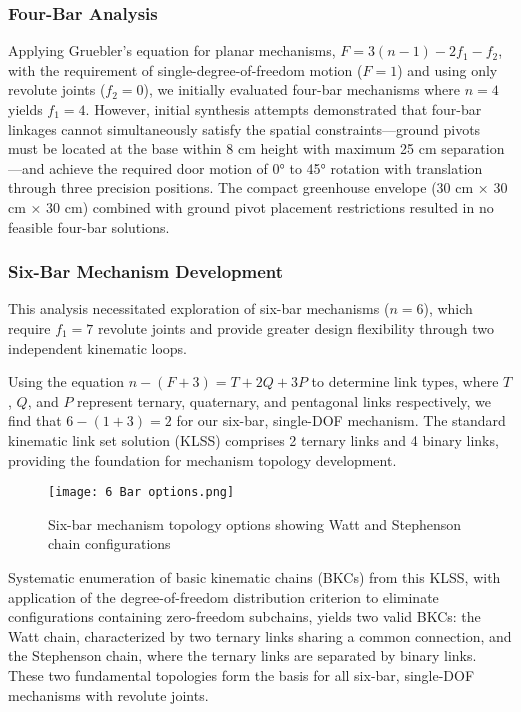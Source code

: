 \documentclass[12pt]{article}
\begin{document}
\subsubsection{Four-Bar Analysis}
Applying Gruebler's equation for planar mechanisms, $F = 3(n-1) - 2f_1 - f_2$, with the requirement of single-degree-of-freedom motion ($F=1$) and using only revolute joints ($f_2=0$), we initially evaluated four-bar mechanisms where $n=4$ yields $f_1=4$. However, initial synthesis attempts demonstrated that four-bar linkages cannot simultaneously satisfy the spatial constraints—ground pivots must be located at the base within 8 cm height with maximum 25 cm separation—and achieve the required door motion of 0° to 45° rotation with translation through three precision positions. The compact greenhouse envelope (30 cm × 30 cm × 30 cm) combined with ground pivot placement restrictions resulted in no feasible four-bar solutions.

\subsubsection{Six-Bar Mechanism Development}
This analysis necessitated exploration of six-bar mechanisms ($n=6$), which require $f_1=7$ revolute joints and provide greater design flexibility through two independent kinematic loops.

Using the equation $n-(F+3)=T+2Q+3P$ to determine link types, where $T$, $Q$, and $P$ represent ternary, quaternary, and pentagonal links respectively, we find that $6-(1+3)=2$ for our six-bar, single-DOF mechanism. The standard kinematic link set solution (KLSS) comprises 2 ternary links and 4 binary links, providing the foundation for mechanism topology development.

\begin{figure}[H]
    \centering
    \texttt{[image: 6 Bar options.png]}
    \caption{Six-bar mechanism topology options showing Watt and Stephenson chain configurations}
    \label{fig:six_bar_options}
\end{figure}

Systematic enumeration of basic kinematic chains (BKCs) from this KLSS, with application of the degree-of-freedom distribution criterion to eliminate configurations containing zero-freedom subchains, yields two valid BKCs: the Watt chain, characterized by two ternary links sharing a common connection, and the Stephenson chain, where the ternary links are separated by binary links. These two fundamental topologies form the basis for all six-bar, single-DOF mechanisms with revolute joints.
\end{document}
